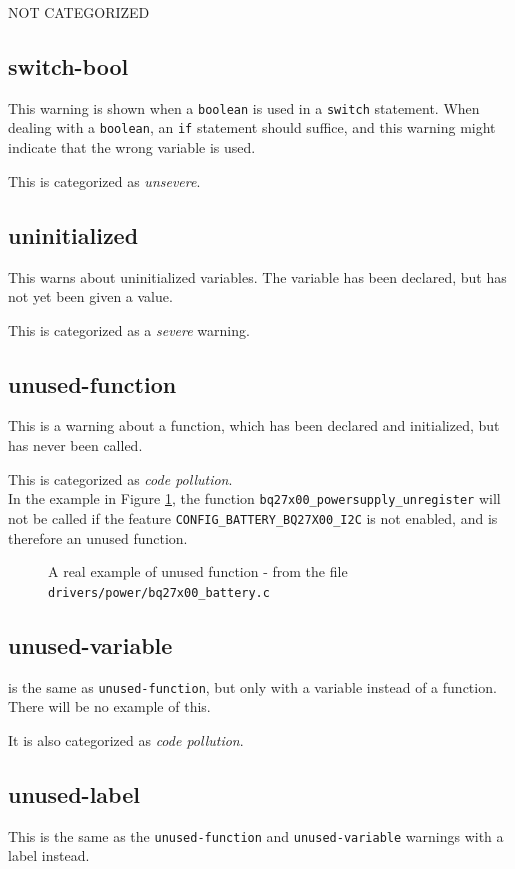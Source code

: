 \documentclass[a4paper,11pt]{report}
\newcommand{\figa}{
    \begin{figure}[!htpb]
    \centering
}
\newcommand{\figb}[2]{
    \caption{#1}
    \label{#2}
    \end{figure}
}
\begin{document}
NOT  CATEGORIZED


            \subsection*{switch-bool}
This warning is shown when a \texttt{boolean} is used in a \texttt{switch} 
statement. When dealing with a \texttt{boolean}, an \texttt{if} statement 
should suffice, and this warning might indicate that the wrong variable is used.

This is categorized as \emph{unsevere}.


            \subsection*{uninitialized}
This warns about uninitialized variables. The variable has been declared, but 
has not yet been given a value.

This is categorized as a \emph{severe} warning.


            \subsection*{unused-function}
This is a warning about a function, which has been declared and initialized, 
but has never been called. 

This is categorized as \emph{code pollution}.
\\

In the example in Figure \ref{lst:unusedfuncreal}, the function 
\texttt{bq27x00\_powersupply\_unregister} will not be called if the feature 
\texttt{CONFIG\_BATTERY\_BQ27X00\_I2C} is not enabled, and is therefore an 
unused function.

\figa
    
\figb{A real example of unused function - from the file 
    \texttt{drivers/power/bq27x00\_battery.c}}{lst:unusedfuncreal}


            \subsection*{unused-variable}
is the same as \texttt{unused-function}, but only with a variable instead of a 
function. There will be no example of this.

It is also categorized as \emph{code pollution}.


            \subsection*{unused-label}
This is the same as the \texttt{unused-function} and \texttt{unused-variable} 
warnings with a label instead.
\end{document}
